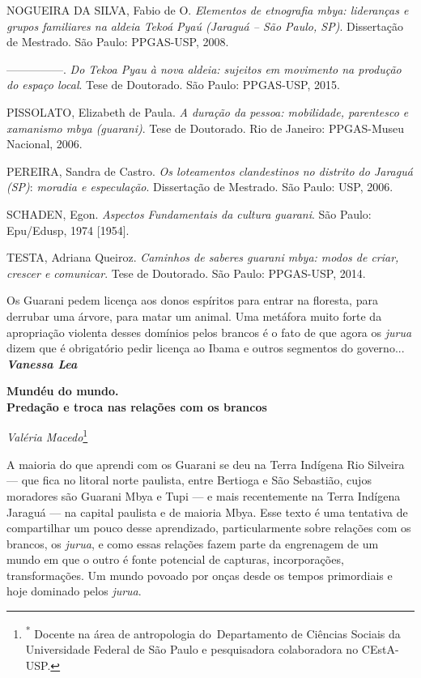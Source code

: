 NOGUEIRA DA SILVA, Fabio de O. \emph{Elementos de etnografia mbya:
lideranças e grupos familiares na aldeia Tekoá Pyaú (Jaraguá -- São
Paulo, SP)}. Dissertação de Mestrado. São Paulo: PPGAS-USP, 2008.

---------------. \emph{Do Tekoa Pyau à nova aldeia: sujeitos em
movimento na produção do espaço local}. Tese de Doutorado. São Paulo:
PPGAS-USP, 2015.

PISSOLATO, Elizabeth de Paula. \emph{A duração da pessoa: mobilidade,
parentesco e xamanismo mbya (guarani)}. Tese de Doutorado. Rio de
Janeiro: PPGAS-Museu Nacional, 2006.

PEREIRA, Sandra de Castro. \emph{Os loteamentos clandestinos no distrito
do Jaraguá (SP)}: \emph{moradia e especulação}. Dissertação de Mestrado.
São Paulo: USP, 2006.

SCHADEN, Egon. \emph{Aspectos Fundamentais da cultura guarani}. São
Paulo: Epu/Edusp, 1974 {[}1954{]}.

TESTA, Adriana Queiroz. \emph{Caminhos de saberes guarani mbya: modos de
criar, crescer e comunicar}. Tese de Doutorado. São Paulo: PPGAS-USP,
2014.

Os Guarani pedem licença aos donos espíritos para entrar na floresta,
para derrubar uma árvore, para matar um animal. Uma metáfora muito forte
da apropriação violenta desses domínios pelos brancos é o fato de que
agora os \emph{jurua} dizem que é obrigatório pedir licença ao Ibama e
outros segmentos do governo... \emph{\textbf{Vanessa Lea}}

\textbf{Mundéu do mundo.\\
Predação e troca nas relações com os brancos }

\emph{Valéria Macedo}\footnote{\textsuperscript{*} Docente na área de
  antropologia do~Departamento de Ciências Sociais da Universidade
  Federal de São Paulo e pesquisadora colaboradora no CEstA-USP.}

A maioria do que aprendi com os Guarani se deu na Terra Indígena Rio
Silveira --- que fica no litoral norte paulista, entre Bertioga e São
Sebastião, cujos moradores são Guarani Mbya e Tupi --- e mais
recentemente na Terra Indígena Jaraguá --- na capital paulista e de
maioria Mbya. Esse texto é uma tentativa de compartilhar um pouco desse
aprendizado, particularmente sobre relações com os brancos, os
\emph{jurua}, e como essas relações fazem parte da engrenagem de um
mundo em que o outro é fonte potencial de capturas, incorporações,
transformações. Um mundo povoado por onças desde os tempos primordiais e
hoje dominado pelos \emph{jurua}.

